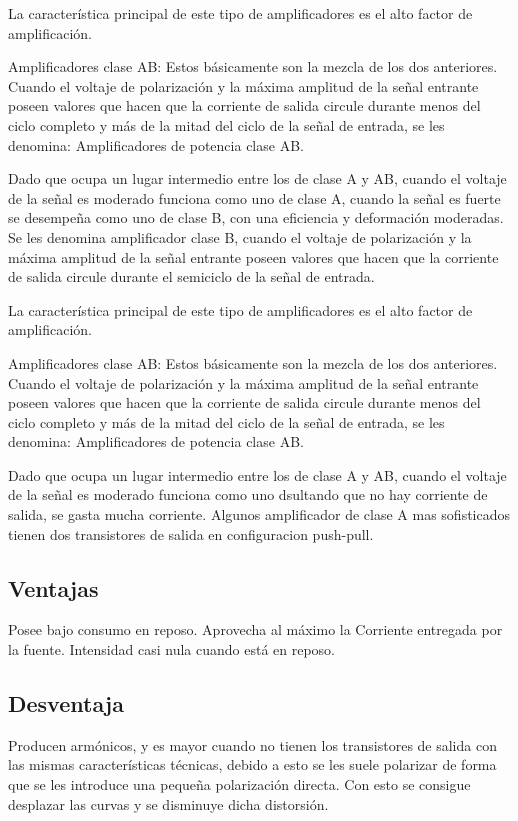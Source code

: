 \documentclass[12pt,a4paper]{article}
\begin{document}
La característica principal de este tipo de amplificadores es el alto factor de amplificación.

Amplificadores clase AB: Estos básicamente son la mezcla de los dos anteriores. Cuando el voltaje de polarización y la máxima amplitud de la señal entrante poseen valores que hacen que la corriente de salida circule durante menos del ciclo completo y más de la mitad del ciclo de la señal de entrada, se les denomina: Amplificadores de potencia clase AB.

Dado que ocupa un lugar intermedio entre los de clase A y AB, cuando el voltaje de la señal es moderado funciona como uno de clase A, cuando la señal es fuerte se desempeña como uno de clase B, con una eficiencia y deformación moderadas.
Se les denomina amplificador clase B, cuando el voltaje de polarización y la máxima amplitud de la señal entrante poseen valores que hacen que la corriente de salida circule durante el semiciclo de la señal de entrada.

La característica principal de este tipo de amplificadores es el alto factor de amplificación.

Amplificadores clase AB: Estos básicamente son la mezcla de los dos anteriores. Cuando el voltaje de polarización y la máxima amplitud de la señal entrante poseen valores que hacen que la corriente de salida circule durante menos del ciclo completo y más de la mitad del ciclo de la señal de entrada, se les denomina: Amplificadores de potencia clase AB.

Dado que ocupa un lugar intermedio entre los de clase A y AB, cuando el voltaje de la señal es moderado funciona como uno dsultando que no hay corriente de salida, se gasta mucha corriente. Algunos amplificador de clase A mas sofisticados tienen dos transistores de salida en configuracion push-pull.

\subsection{Ventajas}
Posee bajo consumo en reposo.
Aprovecha al máximo la Corriente entregada por la fuente.
Intensidad casi nula cuando está en reposo.

\subsection{Desventaja}
Producen armónicos, y es mayor cuando no tienen los transistores de salida con las mismas características técnicas, debido a esto se les suele polarizar de forma que se les introduce una pequeña polarización directa. Con esto se consigue desplazar las curvas y se disminuye dicha distorsión.
\end{document}
